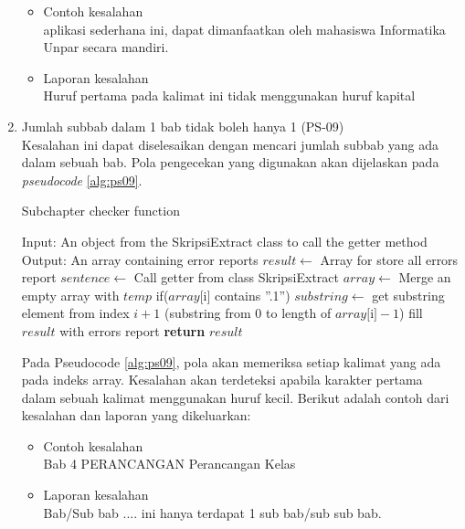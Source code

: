 \begin{enumerate}
	\begin{itemize}
		\item Contoh kesalahan \\ 
		aplikasi sederhana ini, dapat dimanfaatkan oleh mahasiswa Informatika Unpar secara mandiri.
		\item Laporan kesalahan \\
		Huruf pertama pada kalimat ini tidak menggunakan huruf kapital
	\end{itemize}
	
	\item Jumlah subbab dalam 1 bab tidak boleh hanya 1 (PS-09) \\
	Kesalahan ini dapat diselesaikan dengan mencari jumlah subbab yang ada dalam sebuah bab. Pola pengecekan yang digunakan akan dijelaskan pada \textit{pseudocode} \ref{alg:ps09}.

\begin{minipage}{1.0\linewidth}
\begin{algorithm}[H]
    \caption{Subchapter checker function}
	\label{alg:ps09}
	\begin{algorithmic}[1]
		\State Input: An object from the SkripsiExtract class to call the getter method
		\State Output: An array containing error reports 
		\State   	
    		\State $result \gets$ Array for store all errors report
			\State $sentence \gets$ Call getter from class SkripsiExtract
			\State $array \gets$ Merge an empty array with $temp$
				if($array[$i$]$ contains ''.1'')				
				\State $substring \gets$ get substring element from index $i+1$ (substring from 0 to length of $array[$i$]-1$)
                	\State fill $result$ with errors report
            	\EndIf
        	\EndFor
    		\State \textbf{return} $result$
    	\EndFunction
	\end{algorithmic}
\end{algorithm}
\end{minipage}
\medskip
	
	Pada Pseudocode \ref{alg:ps09}, pola akan memeriksa setiap kalimat yang ada pada indeks array. Kesalahan akan terdeteksi apabila karakter pertama dalam sebuah kalimat menggunakan huruf kecil. Berikut adalah contoh dari kesalahan dan laporan yang dikeluarkan:
	
	\begin{itemize}
		\item Contoh kesalahan \\
		Bab 4 \newline PERANCANGAN \newline {} Perancangan Kelas
		\item Laporan kesalahan \\
		Bab/Sub bab .... ini hanya terdapat 1 sub bab/sub sub bab.
	\end{itemize}	
	

\end{enumerate}
